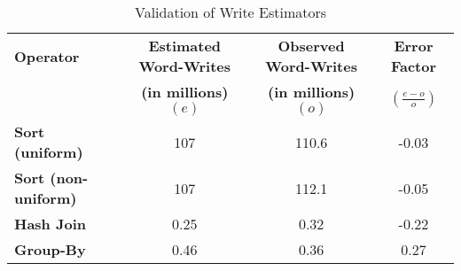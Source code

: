 \begin{table}[!h]                                                                                       
\centering                                                                                              
\caption{Validation of Write Estimators}
  \label{tab:estimator_validation}                                                                                
  \begin{small}                                                                                           
  \begin{tabular}{p{3.5cm} c c c}
  \toprule                                                                                                
  
  \textbf{Operator} &  \textbf{Estimated Word-Writes} \;  & \textbf{Observed Word-Writes}  \; & \textbf{Error Factor} \\
                    & \textbf{(in millions)} $(e)$ & \textbf{(in millions)} $(o)$  & $(\frac{e-o}{o})$\\
  \midrule                                                                                                
  
    \textbf{Sort (uniform)} &  107 & 110.6 &  -0.03\\ 
    \textbf{Sort (non-uniform)} &  107 & 112.1 & -0.05\\ 
  \textbf{Hash Join} &  0.25 & 0.32 & -0.22\\ 
  \textbf{Group-By} &  0.46 & 0.36 & 0.27\\ 
  
  \bottomrule                                                                                             
  \end{tabular}                                                                                           
  \end{small}                                                                                             
  \end{table} 
